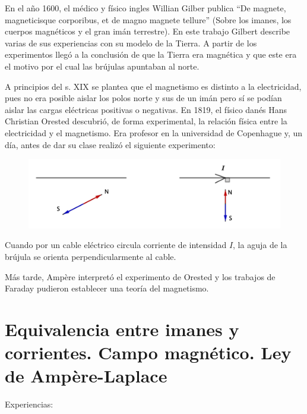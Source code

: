 En el año 1600, el médico y físico ingles Willian Gilber publica
``De magnete, magneticisque corporibus, et de magno magnete tellure'' (Sobre los imanes, los cuerpos magnéticos y el gran imán terrestre). En este trabajo Gilbert describe varias de sus experiencias con su modelo de la Tierra. A partir de los experimentos llegó a la conclusión de que la Tierra era magnética y que este era el motivo por el cual las brújulas apuntaban al norte.

A principios del s. XIX se plantea que el magnetismo es distinto a la electricidad, pues no era posible aislar los polos norte y sus de un imán pero sí se podían aislar las cargas eléctricas positivas o negativas. En 1819, el físico danés Hans Christian Orested  descubrió, de forma experimental, la relación física entre la electricidad y el magnetismo. Era profesor en la universidad de Copenhague y, un día, antes de dar su clase realizó el siguiente experimento:

\begin{figure}[H]
	\centering
	\includegraphics[width=.9\textwidth]{imagenes/imagenes26/T26IM01.png}
\end{figure}

Cuando por un cable eléctrico circula corriente de intensidad $I$, la aguja de la brújula se orienta perpendicularmente al cable.

Más tarde, Ampère interpretó el experimento de Orested y los trabajos de Faraday pudieron establecer una teoría del magnetismo.

\section[Equivalencia entre imanes y corrientes. Campo magnético. Ley de Ampère-Laplace]{Equivalencia entre imanes y corrientes. Campo magnético. Ley de Ampère-Laplace}
Experiencias:

